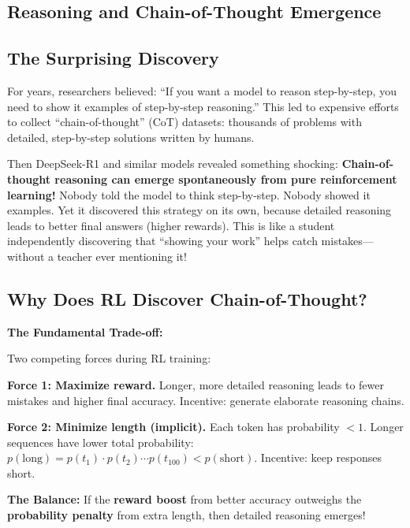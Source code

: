 \begin{chapterenv}

\chapter{Reasoning and Chain-of-Thought Emergence}

\section{The Surprising Discovery}

For years, researchers believed: ``If you want a model to reason step-by-step, you need to show it examples of step-by-step reasoning.'' This led to expensive efforts to collect ``chain-of-thought'' (CoT) datasets: thousands of problems with detailed, step-by-step solutions written by humans.

Then DeepSeek-R1 and similar models revealed something shocking: \textbf{Chain-of-thought reasoning can emerge spontaneously from pure reinforcement learning!} Nobody told the model to think step-by-step. Nobody showed it examples. Yet it discovered this strategy on its own, because detailed reasoning leads to better final answers (higher rewards). This is like a student independently discovering that ``showing your work'' helps catch mistakes---without a teacher ever mentioning it!

\section{Why Does RL Discover Chain-of-Thought?}

\begin{infobox}
\textbf{The Fundamental Trade-off:}

Two competing forces during RL training:

\textbf{Force 1: Maximize reward.} Longer, more detailed reasoning leads to fewer mistakes and higher final accuracy. Incentive: generate elaborate reasoning chains.

\textbf{Force 2: Minimize length (implicit).} Each token has probability $< 1$. Longer sequences have lower total probability: $p(\text{long}) = p(t_1) \cdot p(t_2) \cdots p(t_{100}) < p(\text{short})$. Incentive: keep responses short.

\textbf{The Balance:} If the \textbf{reward boost} from better accuracy outweighs the \textbf{probability penalty} from extra length, then detailed reasoning emerges!


\end{infobox}
\end{chapterenv}
